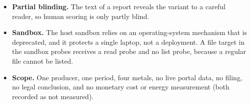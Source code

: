 \begin{itemize}[itemsep=3pt]
      by the gate, and the only accepted finding was wrong (Section~\ref{sec:devquality}). The system's
      detections come mainly from deterministic checks.
\item \textbf{Partial blinding.} The text of a report reveals the variant to a careful reader, so human scoring
      is only partly blind.
\item \textbf{Sandbox.} The host sandbox relies on an operating-system mechanism that is deprecated, and it
      protects a single laptop, not a deployment. A file target in the sandbox probes receives a read probe
      and no list probe, because a regular file cannot be listed.
\item \textbf{Scope.} One producer, one period, four metals, no live portal data, no filing, no legal conclusion,
      and no monetary cost or energy measurement (both recorded as not measured).
\end{itemize}

